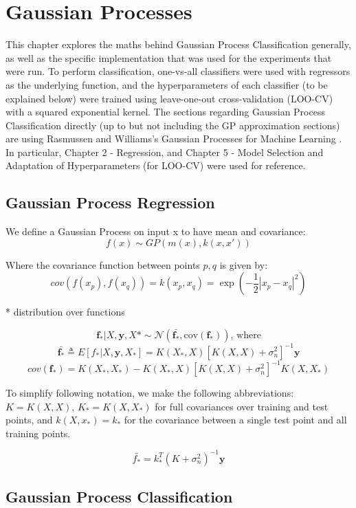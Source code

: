 \chapter{Gaussian Processes} \label{chap:gps}

This chapter explores the maths behind Gaussian Process Classification generally, as well as the specific implementation that was used for the experiments that were run. To perform classification, one-vs-all classifiers were used with regressors as the underlying function, and the hyperparameters of each classifier (to be explained below) were trained using leave-one-out cross-validation (LOO-CV) with a squared exponential kernel. The sections regarding Gaussian Process Classification directly (up to but not including the GP approximation sections) are using Rasmussen and Williams's Gaussian Processes for Machine Learning \citep{rasmussen06}. In particular, Chapter 2 - Regression, and Chapter 5 - Model Selection and Adaptation of Hyperparameters (for LOO-CV) were used for reference.


\section{Gaussian Process Regression}

We define a Gaussian Process on input x to have mean and covariance:
$$f(x) \sim GP(m(x), k(x, x'))$$

Where the covariance function between points $p, q$ is given by:
$$cov(f(x_p), f(x_q)) = k(x_p, x_q) = \exp(-\frac{1}{2}|x_p-x_q|^2)$$

* distribution over functions

$$\mathbf{f_*} | X, \mathbf{y}, X* \sim \mathcal{N}(\mathbf{\bar{f_*}}, \text{cov}(\mathbf{f_*})) \text{, where}$$
$$\mathbf{\bar{f_*}} \triangleq E[f_*|X,\mathbf{y},X_*] = K(X_*, X)[K(X,X) + \sigma^2_n]^{-1}\mathbf{y}$$
$$cov(\mathbf{f_*}) = K(X_*,X_*) - K(X_*, X)[K(X,X) + \sigma_n^2]^{-1}K(X,X_*)$$

To simplify following notation, we make the following abbreviations:
$K = K(X, X)$, $K_* = K(X, X_*)$ for full covariances over training and test points, and $k(X, x_*) = k_*$ for the covariance between a single test point and all training points.

$$\bar{f_*} = k_*^T(K+\sigma_n^2)^{-1} \mathbf{y}$$

\section{Gaussian Process Classification}

